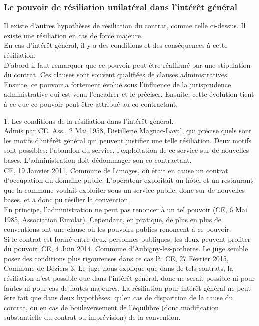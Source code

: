 \documentclass[10pt, a4paper, openany]{book}
\begin{document}
\subsubsection{Le pouvoir de résiliation unilatéral dans l'intérêt général}

Il existe d'autres hypothèses de résiliation du contrat, comme celle ci-dessus. Il existe une résiliation en cas de force majeure. \\
En cas d'intérêt général, il y a des conditions et des conséquences à cette résiliation. \\
D'abord il faut remarquer que ce pouvoir peut être réaffirmé par une stipulation du contrat. Ces clauses sont souvent qualifiées de clauses administratives. Ensuite, ce pouvoir a fortement évolué sous l'influence de la jurisprudence administrative qui est venu l'encadrer et le préciser. Ensuite, cette évolution tient à ce que ce pouvoir peut être attribué au co-contractant. 


1. Les conditions de la résiliation dans l'intérêt général. \\
Admis par CE, Ass., 2 Mai 1958, Distillerie Magnac-Laval, qui précise quels sont les motifs d'intérêt général qui peuvent justifier une telle résiliation. Deux motifs sont possibles: l'abandon du service, l'exploitation de ce service sur de nouvelles bases. L'administration doit dédommager son co-contractant. \\
CE, 19 Janvier 2011, Commune de Limoges, où était en cause un contrat d'occupation du domaine public. L'opérateur exploitait un hôtel et un restaurant que la commune voulait exploiter sous un service public, donc sur de nouvelles bases, et a donc pu résilier la convention. \\
En principe, l'administration ne peut pas renoncer à un tel pouvoir (CE, 6 Mai 1985, Association Eurolat). Cependant, en pratique, de plus en plus de conventions ont une clause où les pouvoirs publics renoncent à ce pouvoir. \\
Si le contrat est formé entre deux personnes publiques, les deux peuvent profiter du pouvoir: CE, 4 Juin 2014, Commune d'Aubigny-les-potheres. Le juge semble poser des conditions plus rigoureuses dans ce cas là: CE, 27 Février 2015, Commune de Béziers 3. Le juge nous explique que dans de tels contrats, la résiliation n'est possible que dans l'intérêt général, donc ne serait possible ni pour fautes ni pour cas de fautes majeures. La résiliation pour intérêt général ne peut être fait que dans deux hypothèses: qu'en cas de disparition de la cause du contrat, ou en cas de bouleversement de l'équilibre (donc modification substantielle du contrat ou imprévision) de la convention. 
\end{document}
